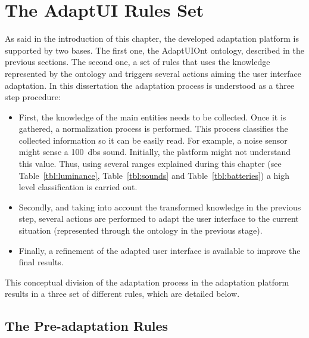 \section{The AdaptUI Rules Set}
\label{sec:adaptui_rules}

As said in the introduction of this chapter, the developed adaptation platform is 
supported by two bases. The first one, the AdaptUIOnt ontology, described in the 
previous sections. The second one, a set of rules that uses the knowledge represented
by the ontology and triggers several actions aiming the user interface adaptation. 
In this dissertation the adaptation process is understood as a three step procedure: 

\begin{itemize}
 \item First, the knowledge of the main entities needs to be collected. Once it
 is gathered, a normalization process is performed. This process classifies the 
 collected information so it can be easily read. For example, a noise sensor
 might sense a 100~\acp{db} sound. Initially, the platform might not understand
 this value. Thus, using several ranges explained during this chapter (see 
 Table~\ref{tbl:luminance}, Table~\ref{tbl:sounds} and Table~\ref{tbl:batteries})
 a high level classification is carried out.
 
 \item Secondly, and taking into account the transformed knowledge in the previous
 step, several actions are performed to adapt the user interface to the current 
 situation (represented through the ontology in the previous stage).
 
 \item Finally, a refinement of the adapted user interface is available to improve
 the final results.
\end{itemize}

This conceptual division of the adaptation process in the adaptation platform 
results in a three set of different rules, which are detailed below.


\subsection{The Pre-adaptation Rules}
\label{sec:preadaptation_rules}

